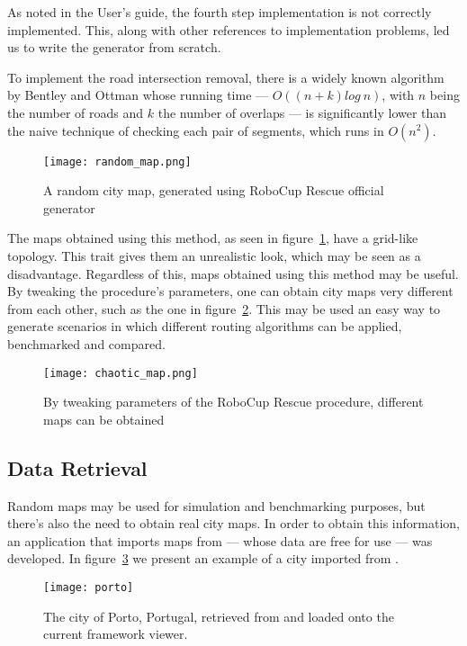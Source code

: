 As noted in the User's guide, the fourth step implementation is not correctly
implemented. This, along with other references to implementation problems, led
us to write the generator from scratch.

To implement the road intersection removal, there is a widely known algorithm
by Bentley and Ottman\cite{bentley-ottman} whose running time --- $O((n + k)
log~n)$, with $n$ being the number of roads and $k$ the number of overlaps ---
is significantly lower than the naive technique of checking each pair of
segments, which runs in $O(n^2)$.

\begin{figure}[h]
\centering
\texttt{[image: random\_map.png]}
\caption{A random city map, generated using RoboCup Rescue official generator}
\label{fig:random_map}
\end{figure}

The maps obtained using this method, as seen in figure~\ref{fig:random_map},
have a grid-like topology. This trait gives them an unrealistic look, which may
be seen as a disadvantage. Regardless of this, maps obtained using this method
may be useful. By tweaking the procedure's parameters, one can obtain city maps
very different from each other, such as the one in
figure~\ref{fig:chaotic_map}. This may be used an easy way to generate
scenarios in which different routing algorithms can be applied, benchmarked and
compared.

\begin{figure}[h]
\centering
\texttt{[image: chaotic\_map.png]}
\caption{By tweaking parameters of the RoboCup Rescue procedure, different maps can be obtained}
\label{fig:chaotic_map}
\end{figure}




\subsection{\osm{} Data Retrieval}
\label{section:osm}

Random maps may be used for simulation and benchmarking purposes, but there's
also the need to obtain real city maps. In order to obtain this information, an
application that imports maps from \osm{} --- whose data are free for use ---
was developed.  In figure~\ref{fig:porto} we present an example of a city
imported from \osm{}.

\begin{figure}[th]
  \begin{center}
    \leavevmode
    \texttt{[image: porto]}
    \caption{The city of Porto, Portugal, retrieved from \osm{} and loaded onto the current framework viewer.}
    \label{fig:porto}
  \end{center}
\end{figure}





